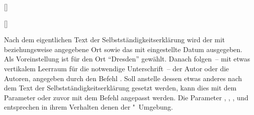 \begin{Declaration*}{}
\begin{Declaration*}{}
\begin{Declaration*}{}
\begin{Declaration}{[]}
\begin{Declaration}[v2.05]{[\LParameter]}
\begin{Declaration}{}
\begin{Declaration}{}
\begin{Declaration}{}
\begin{Declaration}{}
\begin{Declaration}[v2.02]{}
\begin{Declaration}[v2.02]{%
}
\begin{Declaration}[v2.02]{%
}
\begin{Declaration}{}
Nach dem eigentlichen Text der Selbstständigkeitserklärung wird der mit 
 beziehungsweise  angegebene Ort 
sowie das mit  eingestellte Datum ausgegeben. Als Voreinstellung 
ist für den Ort \enquote{Dresden} gewählt. Danach folgen~-- mit etwas 
vertikalem Leerraum für die notwendige Unterschrift~-- der Autor oder die 
Autoren, angegeben durch den Befehl . Soll anstelle dessen etwas 
anderes nach dem Text der Selbstständigkeitserklärung gesetzt werden, kann dies 
mit dem Parameter  oder zuvor mit dem 
Befehl  angepasst werden. Die Parameter 
, 
, 
, 
 und 
 entsprechen in ihrem Verhalten denen 
der "~Umgebung.
\end{Declaration}
\end{Declaration}
\end{Declaration}
\end{Declaration}
\end{Declaration}
\end{Declaration}
\end{Declaration}
\end{Declaration}
\end{Declaration}
\end{Declaration}


\end{Declaration*}
\end{Declaration*}
\end{Declaration*}
